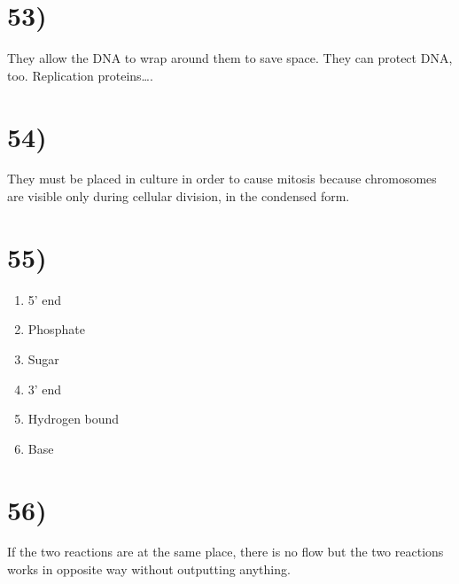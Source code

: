 \section*{53)}
They allow the DNA to wrap around them to save space. They can protect DNA, too. Replication proteins\dots.

\section*{54)}
They must be placed in culture in order to cause mitosis because chromosomes are visible only during cellular division, in the condensed form.

\section*{55)}
\begin{enumerate}
    \item 5' end
    \item Phosphate
    \item Sugar
    \item 3' end
    \item Hydrogen bound
    \item Base
\end{enumerate}

\section*{56)}

If the two reactions are at the same place, there is no flow but the two reactions works in opposite way without outputting anything.


